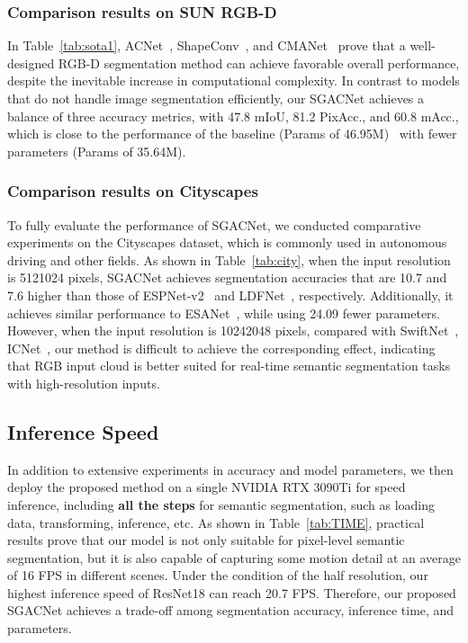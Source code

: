 \documentclass[journal,twoside,web]{ieeecolor}
\begin{document}
\subsubsection{Comparison results on SUN RGB-D}
In Table~\ref{tab:sota1}, ACNet~\cite{ACNet}, ShapeConv~\cite{ShapeConv}, and CMANet~\cite{CMANet} prove that a well-designed RGB-D segmentation method can achieve favorable overall performance, despite the inevitable increase in computational complexity. In contrast to models that do not handle image segmentation efficiently, our SGACNet achieves a balance of three accuracy metrics, with 47.8 mIoU, 81.2 PixAcc., and 60.8 mAcc., which is close to the performance of the baseline (Params of 46.95M)~\cite{ESANet} with fewer parameters (Params of 35.64M).

\subsubsection{Comparison results on Cityscapes}
To fully evaluate the performance of SGACNet, we conducted comparative experiments on the Cityscapes dataset, which is commonly used in autonomous driving and other fields. As shown in Table~\ref{tab:city}, when the input resolution is 5121024 pixels, SGACNet achieves segmentation accuracies that are 10.7 and 7.6 higher than those of ESPNet-v2~\cite{ESPNetv2} and LDFNet~\cite{LDFNet}, respectively. Additionally, it achieves similar performance to ESANet~\cite{ESANet}, while using 24.09 fewer parameters. However, when the input resolution is 10242048 pixels, compared with SwiftNet~\cite{SwiftNet}, ICNet~\cite{ICNet}, our method is difficult to achieve the corresponding effect, indicating that RGB input cloud is better suited for real-time semantic segmentation tasks with high-resolution inputs. 

\subsection{Inference Speed}
In addition to extensive experiments in accuracy and model parameters, we then deploy the proposed method on a single NVIDIA RTX 3090Ti for speed inference, including \textbf{all the steps} for semantic segmentation, such as loading data, transforming, inference, etc. As shown in Table~\ref{tab:TIME}, practical results prove that our model is not only suitable for pixel-level semantic segmentation, but it is also capable of capturing some motion detail at an average of 16 FPS in different scenes. Under the condition of the half resolution, our highest inference speed of ResNet18 can reach 20.7 FPS. Therefore, our proposed SGACNet achieves a trade-off among segmentation accuracy, inference time, and parameters.
\end{document}

